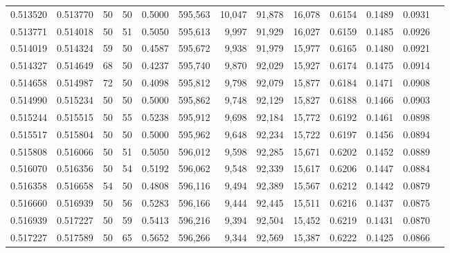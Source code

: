 \begin{tabular}{rrrrrrrrrrrrr}
0.513520 & 0.513770 &    50 &  50 &                                     0.5000 & 595,563 &  10,047 &  91,878 &  16,078 & 0.6154 & 0.1489 & 0.0931 \\
0.513771 & 0.514018 &    50 &  51 &                                     0.5050 & 595,613 &   9,997 &  91,929 &  16,027 & 0.6159 & 0.1485 & 0.0926 \\
0.514019 & 0.514324 &    59 &  50 &                                     0.4587 & 595,672 &   9,938 &  91,979 &  15,977 & 0.6165 & 0.1480 & 0.0921 \\
0.514327 & 0.514649 &    68 &  50 &                                     0.4237 & 595,740 &   9,870 &  92,029 &  15,927 & 0.6174 & 0.1475 & 0.0914 \\
0.514658 & 0.514987 &    72 &  50 &                                     0.4098 & 595,812 &   9,798 &  92,079 &  15,877 & 0.6184 & 0.1471 & 0.0908 \\
0.514990 & 0.515234 &    50 &  50 &                                     0.5000 & 595,862 &   9,748 &  92,129 &  15,827 & 0.6188 & 0.1466 & 0.0903 \\
0.515244 & 0.515515 &    50 &  55 &                                     0.5238 & 595,912 &   9,698 &  92,184 &  15,772 & 0.6192 & 0.1461 & 0.0898 \\
0.515517 & 0.515804 &    50 &  50 &                                     0.5000 & 595,962 &   9,648 &  92,234 &  15,722 & 0.6197 & 0.1456 & 0.0894 \\
0.515808 & 0.516066 &    50 &  51 &                                     0.5050 & 596,012 &   9,598 &  92,285 &  15,671 & 0.6202 & 0.1452 & 0.0889 \\
0.516070 & 0.516356 &    50 &  54 &                                     0.5192 & 596,062 &   9,548 &  92,339 &  15,617 & 0.6206 & 0.1447 & 0.0884 \\
0.516358 & 0.516658 &    54 &  50 &                                     0.4808 & 596,116 &   9,494 &  92,389 &  15,567 & 0.6212 & 0.1442 & 0.0879 \\
0.516660 & 0.516939 &    50 &  56 &                                     0.5283 & 596,166 &   9,444 &  92,445 &  15,511 & 0.6216 & 0.1437 & 0.0875 \\
0.516939 & 0.517227 &    50 &  59 &                                     0.5413 & 596,216 &   9,394 &  92,504 &  15,452 & 0.6219 & 0.1431 & 0.0870 \\
0.517227 & 0.517589 &    50 &  65 &                                     0.5652 & 596,266 &   9,344 &  92,569 &  15,387 & 0.6222 & 0.1425 & 0.0866 \\

\end{tabular}
